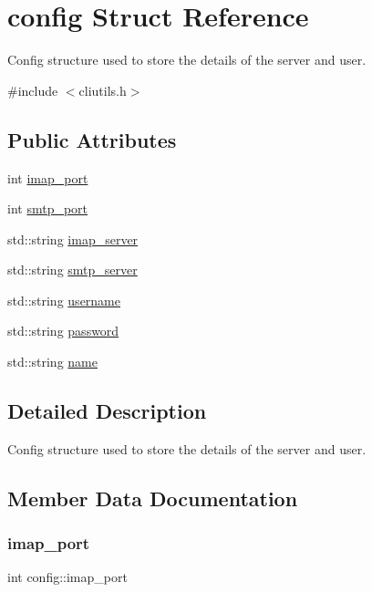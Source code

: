 \hypertarget{structconfig}{}\section{config Struct Reference}
\label{structconfig}


Config structure used to store the details of the server and user.  




{\ttfamily \#include $<$cliutils.\+h$>$}

\subsection*{Public Attributes}
\begin{DoxyCompactItemize}
\item 
int \hyperlink{structconfig_a834ea88fbea2c2a18d2e7ef23374d19f}{imap\+\_\+port}
\item 
int \hyperlink{structconfig_a44d4389827db94790cf76bafcbe72f33}{smtp\+\_\+port}
\item 
std\+::string \hyperlink{structconfig_a4c8a18d5f3d071698eb476e0896ade73}{imap\+\_\+server}
\item 
std\+::string \hyperlink{structconfig_a231eb7850e53d1982cca31c8b7906961}{smtp\+\_\+server}
\item 
std\+::string \hyperlink{structconfig_ac6911ac221a111c05dac0e4288d48401}{username}
\item 
std\+::string \hyperlink{structconfig_a017fab93d15868c7a088caea7c61cd4b}{password}
\item 
std\+::string \hyperlink{structconfig_a1687be0f41021eb63e86a4db7d8145cd}{name}
\end{DoxyCompactItemize}


\subsection{Detailed Description}
Config structure used to store the details of the server and user. 

\subsection{Member Data Documentation}
\mbox{\label{structconfig_a834ea88fbea2c2a18d2e7ef23374d19f}} 
\subsubsection{\texorpdfstring{imap\+\_\+port}{imap\_port}}
{\footnotesize\ttfamily int config\+::imap\+\_\+port}

